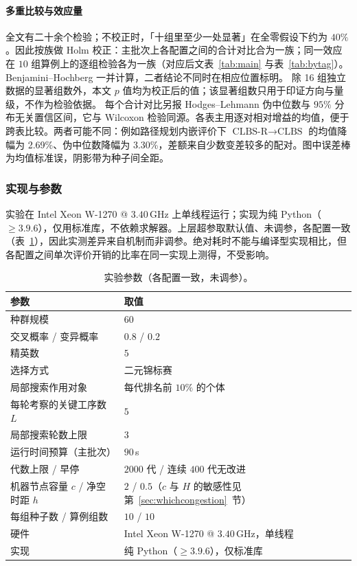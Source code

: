 \documentclass[manuscript,screen,review]{acmart}
\newcommand{\NCases}{10}
\newcommand{\NSeeds}{10}
\newcommand{\GainProbeLoop}{2.69\%}      %
\newcommand{\HLProbeLoop}{3.30\%}
\newcommand{\MatrixCells}{16}
\newcommand{\LSL}{5}                      %
\newcommand{\LSRounds}{3}                 %
\begin{document}
\paragraph{多重比较与效应量}
全文有二十余个检验；不校正时，「十组里至少一处显著」在全零假设下约为 $40\%$。因此按族做 Holm 校正：主批次上各配置之间的合计对比合为一族；同一效应在 $\NCases$ 组算例上的逐组检验各为一族（对应后文表~\ref{tab:main} 与表~\ref{tab:bytag}）。Benjamini--Hochberg 一并计算，二者结论不同时在相应位置标明。
除 \MatrixCells{} 组独立数据的显著组数外，本文 $p$ 值均为校正后的值；该显著组数只用于印证方向与量级，不作为检验依据。
每个合计对比另报 Hodges--Lehmann 伪中位数与 $95\%$ 分布无关置信区间，它与 Wilcoxon 检验同源。各表主用逐对相对增益的均值，便于跨表比较。两者可能不同：例如路径规划内嵌评价下 $\text{CLBS-R}\to\text{CLBS}$ 的均值降幅为 \GainProbeLoop{}、伪中位数降幅为 \HLProbeLoop{}，差额来自少数变差较多的配对。图中误差棒为均值标准误，阴影带为种子间全距。

\subsubsection{实现与参数}
\label{sec:impl}
实验在 Intel Xeon W-1270 @ $3.40$\,GHz 上单线程运行；实现为纯 Python（$\ge 3.9.6$），仅用标准库，不依赖求解器。上层超参取默认值、未调参，各配置一致（表~\ref{tab:params}），因此实测差异来自机制而非调参。绝对耗时不能与编译型实现相比，但各配置之间单次评价开销的比率在同一实现上测得，不受影响。

\begin{table}[ht]
\caption{实验参数（各配置一致，未调参）。}
\label{tab:params}
\small
\begin{tabular}{@{}ll@{}}
\toprule
参数 & 取值 \\
\midrule
种群规模 & $60$ \\
交叉概率 / 变异概率 & $0.8$ / $0.2$ \\
精英数 & $5$ \\
选择方式 & 二元锦标赛 \\
局部搜索作用对象 & 每代排名前 $10\%$ 的个体 \\
每轮考察的关键工序数 $L$ & $\LSL$ \\
局部搜索轮数上限 & $\LSRounds$ \\
运行时间预算（主批次） & $90$\,s \\
代数上限 / 早停 & $2000$ 代 / 连续 $400$ 代无改进 \\
机器节点容量 $c$ / 净空时距 $h$ & $2$ / $0.5$（$c$ 与 $H$ 的敏感性见第~\ref{sec:whichcongestion}~节） \\
每组种子数 / 算例组数 & $\NSeeds$ / $\NCases$ \\
硬件 & Intel Xeon W-1270 @ $3.40$\,GHz，单线程 \\
实现 & 纯 Python（$\ge 3.9.6$），仅标准库 \\
\bottomrule
\end{tabular}
\end{table}
\end{document}
